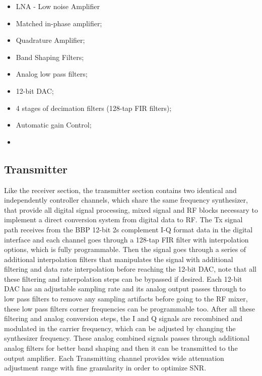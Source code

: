 \begin{itemize}
	\item LNA - Low noise Amplifier
	\item Matched in-phase amplifier;
	\item Quadrature Amplifier;
	\item Band Shaping Filters;
	\item Analog low pass filters;
	\item 12-bit DAC;
	\item 4 stages of decimation filters (128-tap FIR filters);
	\item Automatic gain Control;
	\item
\end{itemize}

\subsection{Transmitter}

Like the receiver section, the transmitter section contains two identical and independently controller channels, which share the same frequency synthesizer,  that provide all digital signal processing, mixed signal and RF blocks necessary to implement a direct conversion system from digital data to RF.
The Tx signal path receives from the BBP 12-bit 2s complement I-Q format data in the digital interface and each channel goes through a 128-tap FIR filter with interpolation options, which is fully programmable. Then the signal goes through a series of additional interpolation filters that manipulates the signal with additional filtering and data rate interpolation before reaching the 12-bit DAC, note that all these filtering and interpolation steps can be bypassed if desired.
Each 12-bit DAC has an adjustable sampling rate and its analog output passes through to low pass filters to remove any sampling artifacts before going to the RF mixer, these low pass filters corner frequencies can be programmable too. After all these filtering and analog conversion steps, the I and Q signals are recombined and modulated in the carrier frequency, which can be adjusted by changing the synthesizer frequency. These analog combined signals passes through additional analog filters for better band shaping and then it can be transmitted to the output amplifier. Each Transmitting channel provides wide attenuation adjustment range with fine granularity in order to optimize SNR.



